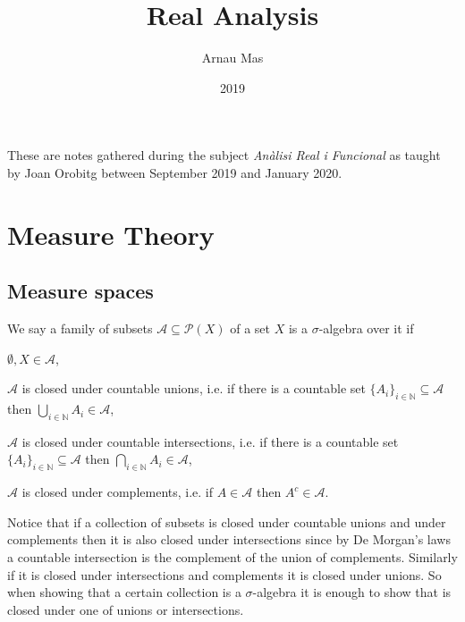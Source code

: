 \documentclass[12pt,oneside]{book}
\title{Real Analysis}
\author{Arnau Mas}
\date{2019}
\numberwithin{table}{section}
\numberwithin{equation}{section}
\numberwithin{figure}{section}
\newcommand{\N}{\mathbb{N}}
\newcommand{\A}{\mathcal{A}}
\renewcommand{\P}{\mathcal{P}}
\begin{document}
\maketitle

\frontmatter
\pagestyle{plain}
These are notes gathered during the subject \emph{Anàlisi Real i Funcional} as taught by Joan Orobitg between September 2019 and January 2020.

\mainmatter

\chapter{Measure Theory}
\section{Measure spaces}
\begin{definition}
	We say a family of subsets \( \A \subseteq \P(X) \) of a set \( X \) is a \( \sigma \)-algebra over it if
	\begin{points}
	\item \( \emptyset, X \in \A \),
	\item \( \A \) is closed under countable unions, i.e. if there is a countable set \( \{ A_i \}_{i \in \N} \subseteq \A \) then \( \bigcup_{i \in \N} A_i \in \A \),
	\item \( \A \) is closed under countable intersections, i.e. if there is a countable set \( \{ A_i \}_{i \in \N} \subseteq \A \) then \( \bigcap_{i \in \N} A_i \in \A \),
	\item \( \A \) is closed under complements, i.e. if \( A \in \A \) then \( A^c \in \A \).
	\end{points}
\end{definition}
Notice that if a collection of subsets is closed under countable unions and under complements then it is also closed under intersections since by De Morgan's laws a countable intersection is the complement of the union of complements. Similarly if it is closed under intersections and complements it is closed under unions. So when showing that a certain collection is a \( \sigma \)-algebra it is enough to show that is closed under one of unions or intersections.
\end{document}
